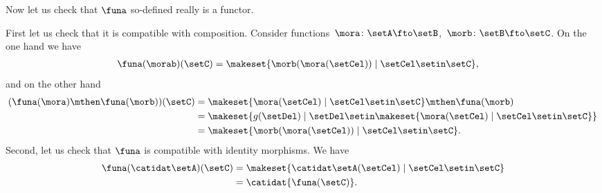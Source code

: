 \begin{example}
    Now let us check that $\funa$ so-defined really is a functor. 
    
    First let us check that it is compatible with composition. Consider functions~$\mora\colon \setA\fto \setB$,~$\morb\colon \setB \fto \setC$.
    On the one hand we have
    \begin{equation}\label{eq:powerset-functor-example-3}
        \begin{aligned}
            \funa(\morab)(\setC) & =\makeset{ \morb(\mora(\setCel))\mid \setCel \setin \setC},
        \end{aligned}
    \end{equation}
    and on the other hand
    \begin{equation}\label{eq:powerset-functor-example-4}
        \begin{aligned}
            (\funa(\mora)\mthen \funa(\morb))(\setC)
             & =\makeset{ \mora(\setCel) \mid \setCel \setin \setC}\mthen \funa(\morb) \\
             & =\makeset{g(\setDel)\mid \setDel \setin \makeset{\mora(\setCel)\mid \setCel\setin \setC}} \\
             & =\makeset{ \morb(\mora(\setCel))\mid \setCel \setin \setC}.
        \end{aligned}
    \end{equation}
    Second, let us check that $\funa$ is compatible with identity morphisms. We have
    \begin{equation}\label{eq:powerset-functor-example-5}
        \begin{aligned}
            \funa(\catidat\setA)(\setC) & = \makeset{\catidat\setA(\setCel)\mid \setCel \setin \setC} \\
                                        & =\catidat{\funa(\setC)}.
        \end{aligned}
    \end{equation}
\end{example}


